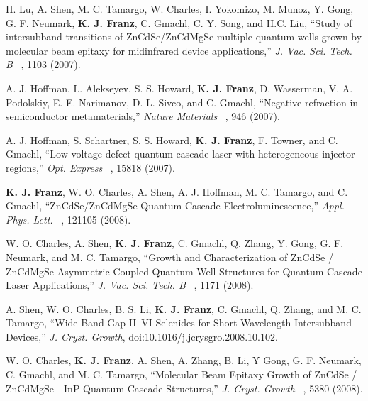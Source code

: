 \begin{list}{}{
  \setlength{\leftmargin}{0.25in}
  \setlength{\rightmargin}{0.25in}
  \setlength{\itemsep}{6pt}
}
\item H. Lu, A. Shen, M. C. Tamargo, W. Charles, I. Yokomizo, M. Munoz, Y. Gong, \linebreak G. F. Neumark, \textbf{K. J. Franz}, C. Gmachl, C. Y. Song, and H.C. Liu, ``Study of intersubband transitions of ZnCdSe/ZnCdMgSe multiple quantum wells grown by molecular beam epitaxy for midinfrared device applications,'' \linebreak \emph{J. Vac. Sci. Tech. B}~ , 1103 (2007).
\item A. J. Hoffman, L. Alekseyev, S. S. Howard, \textbf{K. J. Franz}, D. Wasserman, \linebreak V. A. Podolskiy, E. E. Narimanov, D. L. Sivco, and C. Gmachl, ``Negative refraction in semiconductor metamaterials,'' \emph{Nature Materials}~ , 946 (2007).
\item A. J. Hoffman, S. Schartner, S. S. Howard, \textbf{K. J. Franz}, F. Towner, and C. Gmachl, ``Low voltage-defect quantum cascade laser with heterogeneous injector regions,'' \emph{Opt. Express}~ , 15818 (2007).
\item \textbf{K. J. Franz}, W. O. Charles, A. Shen, A. J. Hoffman, M. C. Tamargo, and C. Gmachl, ``ZnCdSe/ZnCdMgSe Quantum Cascade Electroluminescence,'' \emph{Appl. Phys. Lett.}~  \linebreak {}, 121105 (2008).
\item W. O. Charles, A. Shen, \textbf{K. J. Franz}, C. Gmachl, Q. Zhang, Y. Gong, G. F. Neumark, and M. C. Tamargo, ``Growth and Characterization of ZnCdSe / \linebreak ZnCdMgSe Asymmetric Coupled Quantum Well Structures for Quantum Cascade Laser Applications,'' \emph{J. Vac. Sci. Tech. B}~ , 1171 (2008).
\item A. Shen, W. O. Charles, B. S. Li, \textbf{K. J. Franz}, C. Gmachl, Q. Zhang, and M. C. Tamargo, ``Wide Band Gap II--VI Selenides for Short Wavelength Intersubband Devices,''  \linebreak \emph{J. Cryst. Growth}, doi:10.1016/j.jcrysgro.2008.10.102.
\item W. O. Charles, \textbf{K. J. Franz}, A. Shen, A. Zhang, B. Li, Y Gong, G. F. Neumark,  \linebreak C. Gmachl, and M. C. Tamargo, ``Molecular Beam Epitaxy Growth of ZnCdSe / ZnCdMgSe---InP Quantum Cascade Structures,'' \emph{J. Cryst. Growth}~ , 5380 (2008).

\end{list}
